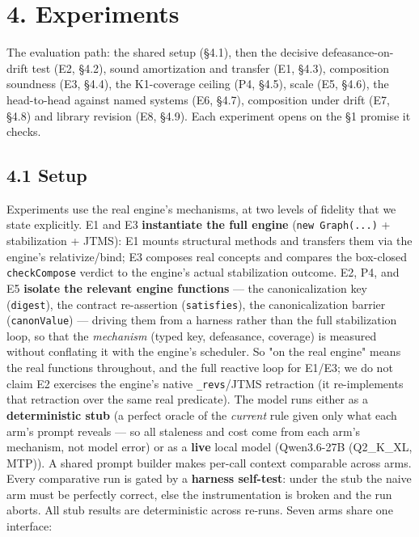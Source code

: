\documentclass[11pt]{article}
\begin{document}
\section*{4. Experiments}

The evaluation path: the shared setup (§4.1), then the decisive defeasance-on-drift test (E2, §4.2), sound amortization and transfer (E1, §4.3), composition soundness (E3, §4.4), the K1-coverage ceiling (P4, §4.5), scale (E5, §4.6), the head-to-head against named systems (E6, §4.7), composition under drift (E7, §4.8) and library revision (E8, §4.9). Each experiment opens on the §1 promise it checks.

\subsection*{4.1 Setup}

Experiments use the real engine's mechanisms, at two levels of fidelity that we state explicitly. E1 and E3 \textbf{instantiate the full engine} (\texttt{new Graph(...)} + stabilization + JTMS): E1 mounts structural methods and transfers them via the engine's relativize/bind; E3 composes real concepts and compares the box-closed \texttt{checkCompose} verdict to the engine's actual stabilization outcome. E2, P4, and E5 \textbf{isolate the relevant engine functions} — the canonicalization key (\texttt{digest}), the contract re-assertion (\texttt{satisfies}), the canonicalization barrier (\texttt{canonValue}) — driving them from a harness rather than the full stabilization loop, so that the \emph{mechanism} (typed key, defeasance, coverage) is measured without conflating it with the engine's scheduler. So "on the real engine" means the real functions throughout, and the full reactive loop for E1/E3; we do not claim E2 exercises the engine's native \texttt{\_revs}/JTMS retraction (it re-implements that retraction over the same real predicate). The model runs either as a \textbf{deterministic stub} (a perfect oracle of the \emph{current} rule given only what each arm's prompt reveals — so all staleness and cost come from each arm's mechanism, not model error) or as a \textbf{live} local model (Qwen3.6-27B (Q2\_K\_XL, MTP)). A shared prompt builder makes per-call context comparable across arms. Every comparative run is gated by a \textbf{harness self-test}: under the stub the naive arm must be perfectly correct, else the instrumentation is broken and the run aborts. All stub results are deterministic across re-runs. Seven arms share one interface:
\end{document}
